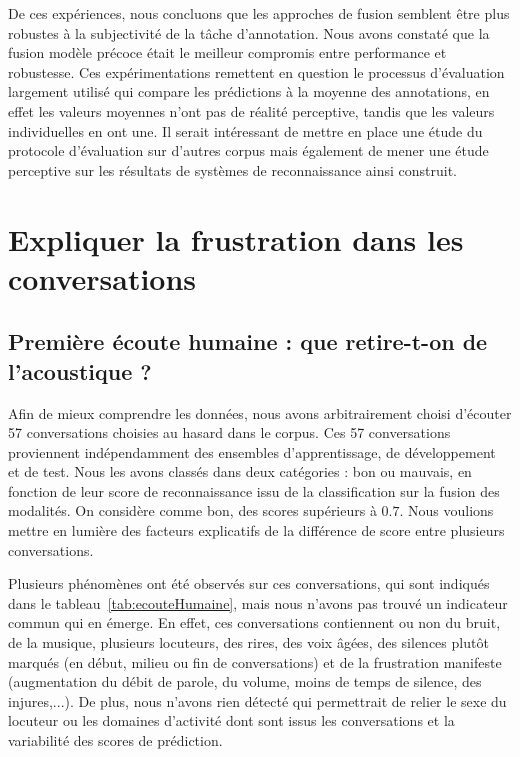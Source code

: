 De ces expériences, nous concluons que les approches de fusion semblent être plus robustes à la subjectivité de la tâche d'annotation. Nous avons constaté que la fusion modèle précoce était le meilleur compromis entre performance et robustesse.
Ces expérimentations remettent en question le processus d'évaluation largement utilisé qui compare les prédictions à la moyenne des annotations, en effet les valeurs moyennes n'ont pas de réalité perceptive, tandis que les valeurs individuelles en ont une. Il serait intéressant de mettre en place une étude du protocole d'évaluation sur d'autres corpus mais également de mener une étude perceptive sur les résultats de systèmes de reconnaissance ainsi construit.


\section{Expliquer la frustration dans les conversations}

\subsection{Première écoute humaine : que retire-t-on de l'acoustique ?}
Afin de mieux comprendre les données, nous avons arbitrairement choisi d'écouter 57 conversations choisies au hasard dans le corpus. Ces 57 conversations proviennent indépendamment des ensembles d'apprentissage, de développement et de test. Nous les avons classés dans deux catégories : bon ou mauvais, en fonction de leur score de reconnaissance issu de la classification sur la fusion des modalités. On considère comme bon, des scores supérieurs à $0.7$. Nous voulions mettre en lumière des facteurs explicatifs de la différence de score entre plusieurs conversations.



Plusieurs phénomènes ont été observés sur ces conversations, qui sont indiqués dans le tableau~\ref{tab:ecouteHumaine}, mais nous n'avons pas trouvé un indicateur commun qui en émerge. En effet, ces conversations contiennent ou non du bruit, de la musique, plusieurs locuteurs, des rires, des voix âgées, des silences plutôt marqués (en début, milieu ou fin de conversations) et de la frustration manifeste (augmentation du débit de parole, du volume, moins de temps de silence, des injures,...). De plus, nous n'avons rien détecté qui permettrait de relier le sexe du locuteur ou les domaines d'activité dont sont issus les conversations et la variabilité des scores de prédiction.

